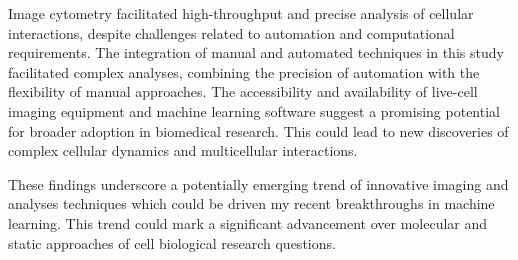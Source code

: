 Image cytometry facilitated high-throughput and precise analysis of cellular
interactions, despite challenges related to automation and computational
requirements. The integration of manual and automated techniques in this study
facilitated complex analyses, combining the precision of automation with the
flexibility of manual approaches. The accessibility and availability of
live-cell imaging equipment and machine learning software suggest a promising
potential for broader adoption in biomedical research. This could lead to new
discoveries of complex cellular dynamics and multicellular interactions.

These findings underscore a potentially emerging trend of innovative imaging and
analyses techniques which could be driven my recent breakthroughs in machine
learning. This trend could mark a significant advancement over molecular
and static approaches of cell biological research questions.







